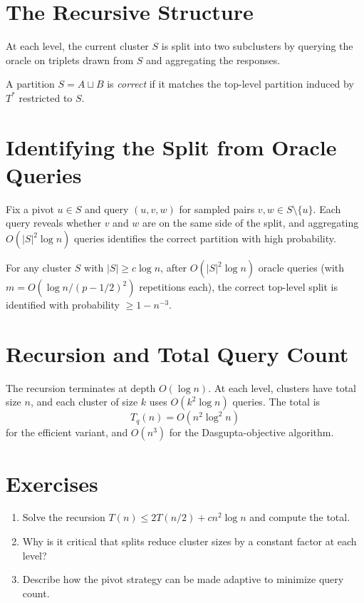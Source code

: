 \section{The Recursive Structure}

At each level, the current cluster $S$ is split into two subclusters by querying the oracle on triplets drawn from $S$ and aggregating the responses.

\begin{definition}
A partition $S = A \sqcup B$ is \emph{correct} if it matches the top-level partition induced by $T^*$ restricted to $S$.
\end{definition}

\section{Identifying the Split from Oracle Queries}

Fix a pivot $u \in S$ and query $(u, v, w)$ for sampled pairs $v, w \in S \setminus \{u\}$. Each query reveals whether $v$ and $w$ are on the same side of the split, and aggregating $O(|S|^2 \log n)$ queries identifies the correct partition with high probability.

\begin{theorem}
\label{thm:split_id}
For any cluster $S$ with $|S| \geq c\log n$, after $O(|S|^2 \log n)$ oracle queries (with $m = O(\log n/(p-1/2)^2)$ repetitions each), the correct top-level split is identified with probability $\geq 1 - n^{-3}$.
\end{theorem}

\section{Recursion and Total Query Count}

The recursion terminates at depth $O(\log n)$. At each level, clusters have total size $n$, and each cluster of size $k$ uses $O(k^2 \log n)$ queries. The total is
\[
T_q(n) = O(n^2 \log^2 n)
\]
for the efficient variant, and $O(n^3)$ for the Dasgupta-objective algorithm.

\section{Exercises}

\begin{enumerate}
  \item Solve the recursion $T(n) \leq 2T(n/2) + cn^2\log n$ and compute the total.
  \item Why is it critical that splits reduce cluster sizes by a constant factor at each level?
  \item Describe how the pivot strategy can be made adaptive to minimize query count.
\end{enumerate}
